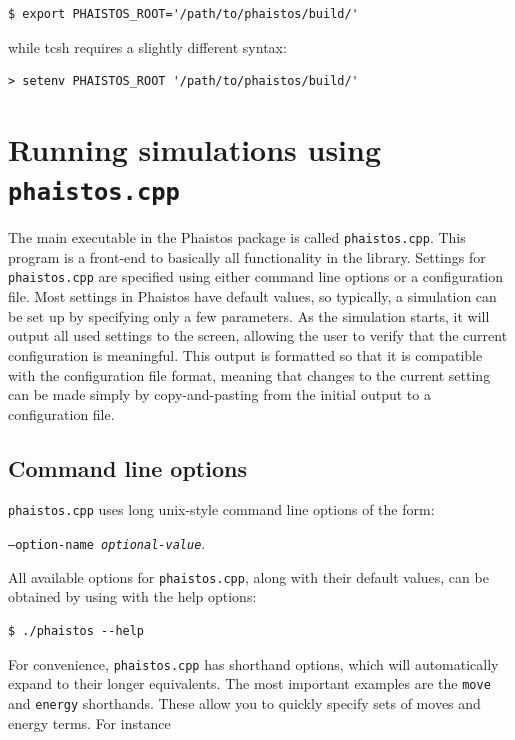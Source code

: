 \documentclass[11pt,a4paper,twoside]{book}
\begin{document}
\begin{verbatim}
$ export PHAISTOS_ROOT='/path/to/phaistos/build/'
\end{verbatim}

\noindent
while tcsh requires a slightly different syntax:

\begin{verbatim}
> setenv PHAISTOS_ROOT '/path/to/phaistos/build/'
\end{verbatim}



\chapter{Running simulations using \texttt{phaistos.cpp}}
\label{cha:running-simulations}

The main executable in the Phaistos package is called
\texttt{phaistos.cpp}. This program is a front-end to basically all
functionality in the library. Settings for \texttt{phaistos.cpp} are
specified using either command line options or a configuration
file. Most settings in Phaistos have default values, so typically, a
simulation can be set up by specifying only a few parameters. As the
simulation starts, it will output all used settings to the screen,
allowing the user to verify that the current configuration is
meaningful. This output is formatted so that it is compatible with the
configuration file format, meaning that changes to the current setting
can be made simply by copy-and-pasting from the initial output to a
configuration file.

\section{Command line options}
\label{sec:command-line-options}

\texttt{phaistos.cpp} uses long unix-style command line options of the form:

\begin{flushleft}
\texttt{--option-name \emph{optional-value}}. 
\end{flushleft}

\noindent All available options for \texttt{phaistos.cpp}, along with
their default values, can be obtained by using with the help options:

\begin{verbatim}
$ ./phaistos --help
\end{verbatim}

\noindent For convenience, \texttt{phaistos.cpp} has shorthand
options, which will automatically expand to their longer
equivalents. The most important examples are the \texttt{move} and
\texttt{energy} shorthands. These allow you to quickly specify sets of
moves and energy terms. For instance
\end{document}
